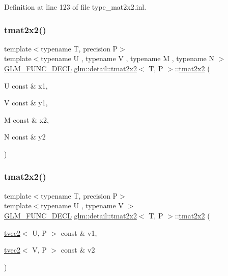 Definition at line 123 of file type\+\_\+mat2x2.\+inl.

\mbox{\label{structglm_1_1detail_1_1tmat2x2_adef8daef1582260e30e727f31ec58fc4}} 
\subsubsection{\texorpdfstring{tmat2x2()}{tmat2x2()}\hspace{0.1cm}{\footnotesize\ttfamily [8/22]}}
{\footnotesize\ttfamily template$<$typename T, precision P$>$ \\
template$<$typename U , typename V , typename M , typename N $>$ \\
\hyperlink{setup_8hpp_ab2d052de21a70539923e9bcbf6e83a51}{G\+L\+M\+\_\+\+F\+U\+N\+C\+\_\+\+D\+E\+CL} \hyperlink{structglm_1_1detail_1_1tmat2x2}{glm\+::detail\+::tmat2x2}$<$ T, P $>$\+::\hyperlink{structglm_1_1detail_1_1tmat2x2}{tmat2x2} (\begin{DoxyParamCaption}\item[{U const \&}]{x1,  }\item[{V const \&}]{y1,  }\item[{M const \&}]{x2,  }\item[{N const \&}]{y2 }\end{DoxyParamCaption})}

\mbox{\label{structglm_1_1detail_1_1tmat2x2_a09f5f84943ae5636f82d1483cc815ef3}} 
\subsubsection{\texorpdfstring{tmat2x2()}{tmat2x2()}\hspace{0.1cm}{\footnotesize\ttfamily [9/22]}}
{\footnotesize\ttfamily template$<$typename T, precision P$>$ \\
template$<$typename U , typename V $>$ \\
\hyperlink{setup_8hpp_ab2d052de21a70539923e9bcbf6e83a51}{G\+L\+M\+\_\+\+F\+U\+N\+C\+\_\+\+D\+E\+CL} \hyperlink{structglm_1_1detail_1_1tmat2x2}{glm\+::detail\+::tmat2x2}$<$ T, P $>$\+::\hyperlink{structglm_1_1detail_1_1tmat2x2}{tmat2x2} (\begin{DoxyParamCaption}\item[{\hyperlink{structglm_1_1detail_1_1tvec2}{tvec2}$<$ U, P $>$ const \&}]{v1,  }\item[{\hyperlink{structglm_1_1detail_1_1tvec2}{tvec2}$<$ V, P $>$ const \&}]{v2 }\end{DoxyParamCaption})}

